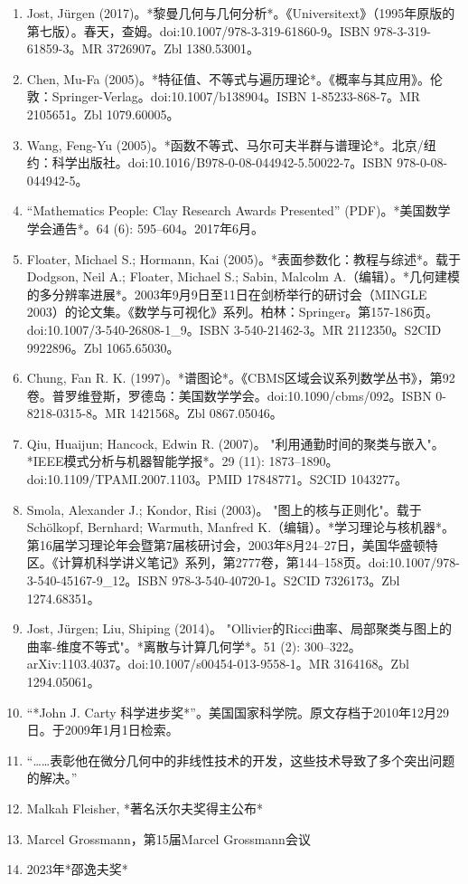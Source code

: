\begin{enumerate}
\item Jost, Jürgen (2017)。*黎曼几何与几何分析*。《Universitext》（1995年原版的第七版）。春天，查姆。doi:10.1007/978-3-319-61860-9。ISBN 978-3-319-61859-3。MR 3726907。Zbl 1380.53001。  
\item Chen, Mu-Fa (2005)。*特征值、不等式与遍历理论*。《概率与其应用》。伦敦：Springer-Verlag。doi:10.1007/b138904。ISBN 1-85233-868-7。MR 2105651。Zbl 1079.60005。
\item Wang, Feng-Yu (2005)。*函数不等式、马尔可夫半群与谱理论*。北京/纽约：科学出版社。doi:10.1016/B978-0-08-044942-5.50022-7。ISBN 978-0-08-044942-5。  
\item “Mathematics People: Clay Research Awards Presented” (PDF)。*美国数学学会通告*。64 (6): 595–604。2017年6月。  
\item Floater, Michael S.; Hormann, Kai (2005)。*表面参数化：教程与综述*。载于 Dodgson, Neil A.; Floater, Michael S.; Sabin, Malcolm A.（编辑）。*几何建模的多分辨率进展*。2003年9月9日至11日在剑桥举行的研讨会（MINGLE 2003）的论文集。《数学与可视化》系列。柏林：Springer。第157-186页。doi:10.1007/3-540-26808-1_9。ISBN 3-540-21462-3。MR 2112350。S2CID 9922896。Zbl 1065.65030。  
\item Chung, Fan R. K. (1997)。*谱图论*。《CBMS区域会议系列数学丛书》，第92卷。普罗维登斯，罗德岛：美国数学学会。doi:10.1090/cbms/092。ISBN 0-8218-0315-8。MR 1421568。Zbl 0867.05046。
\item Qiu, Huaijun; Hancock, Edwin R. (2007)。 "利用通勤时间的聚类与嵌入"。*IEEE模式分析与机器智能学报*。29 (11): 1873–1890。doi:10.1109/TPAMI.2007.1103。PMID 17848771。S2CID 1043277。  
\item Smola, Alexander J.; Kondor, Risi (2003)。 "图上的核与正则化"。载于 Schölkopf, Bernhard; Warmuth, Manfred K.（编辑）。*学习理论与核机器*。第16届学习理论年会暨第7届核研讨会，2003年8月24–27日，美国华盛顿特区。《计算机科学讲义笔记》系列，第2777卷，第144–158页。doi:10.1007/978-3-540-45167-9_12。ISBN 978-3-540-40720-1。S2CID 7326173。Zbl 1274.68351。  
\item Jost, Jürgen; Liu, Shiping (2014)。 "Ollivier的Ricci曲率、局部聚类与图上的曲率-维度不等式"。*离散与计算几何学*。51 (2): 300–322。arXiv:1103.4037。doi:10.1007/s00454-013-9558-1。MR 3164168。Zbl 1294.05061。
\item “*John J. Carty 科学进步奖*”。美国国家科学院。原文存档于2010年12月29日。于2009年1月1日检索。  
\item “……表彰他在微分几何中的非线性技术的开发，这些技术导致了多个突出问题的解决。”  
\item Malkah Fleisher, *著名沃尔夫奖得主公布*  
\item Marcel Grossmann，第15届Marcel Grossmann会议  
\item 2023年*邵逸夫奖*
\end{enumerate}
